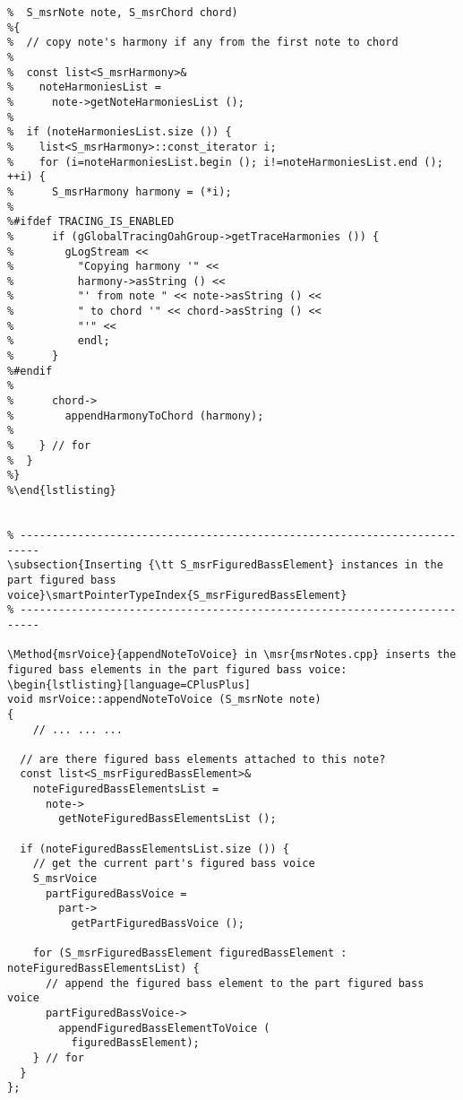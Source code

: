%
\begin{lstlisting}[language=CPlusPlus]
%void mxsr2msrTranslator::copyNoteHarmoniesToChord (
%  S_msrNote note, S_msrChord chord)
%{
%  // copy note's harmony if any from the first note to chord
%
%  const list<S_msrHarmony>&
%    noteHarmoniesList =
%      note->getNoteHarmoniesList ();
%
%  if (noteHarmoniesList.size ()) {
%    list<S_msrHarmony>::const_iterator i;
%    for (i=noteHarmoniesList.begin (); i!=noteHarmoniesList.end (); ++i) {
%      S_msrHarmony harmony = (*i);
%
%#ifdef TRACING_IS_ENABLED
%      if (gGlobalTracingOahGroup->getTraceHarmonies ()) {
%        gLogStream <<
%          "Copying harmony '" <<
%          harmony->asString () <<
%          "' from note " << note->asString () <<
%          " to chord '" << chord->asString () <<
%          "'" <<
%          endl;
%      }
%#endif
%
%      chord->
%        appendHarmonyToChord (harmony);
%
%    } // for
%  }
%}
%\end{lstlisting}


\subsection{Inserting {\tt S_msrFiguredBassElement} instances in the part figured bass voice}\smartPointerTypeIndex{S_msrFiguredBassElement}

\Method{msrVoice}{appendNoteToVoice} in \msr{msrNotes.cpp} inserts the figured bass elements in the part figured bass voice:
\begin{lstlisting}[language=CPlusPlus]
void msrVoice::appendNoteToVoice (S_msrNote note)
{
	// ... ... ...

  // are there figured bass elements attached to this note?
  const list<S_msrFiguredBassElement>&
    noteFiguredBassElementsList =
      note->
        getNoteFiguredBassElementsList ();

  if (noteFiguredBassElementsList.size ()) {
    // get the current part's figured bass voice
    S_msrVoice
      partFiguredBassVoice =
        part->
          getPartFiguredBassVoice ();

    for (S_msrFiguredBassElement figuredBassElement : noteFiguredBassElementsList) {
      // append the figured bass element to the part figured bass voice
      partFiguredBassVoice->
        appendFiguredBassElementToVoice (
          figuredBassElement);
    } // for
  }
};
\end{lstlisting}


